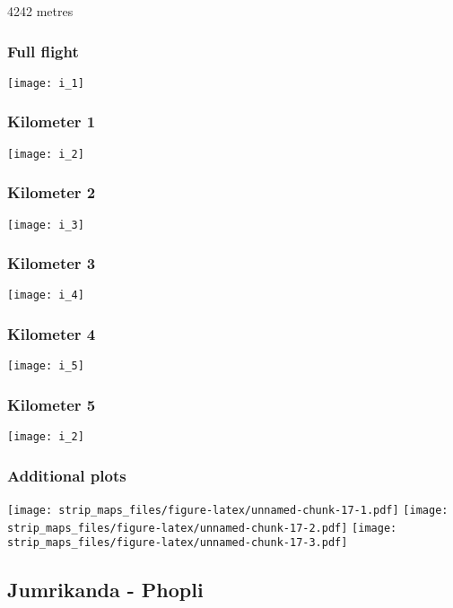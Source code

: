 \documentclass[]{article}
\begin{document}
4242 metres

\subsubsection{Full flight}\label{full-flight-8}

\texttt{[image: i\_1]}

\subsubsection{Kilometer 1}\label{kilometer-1-8}

\texttt{[image: i\_2]}

\subsubsection{Kilometer 2}\label{kilometer-2-8}

\texttt{[image: i\_3]}

\subsubsection{Kilometer 3}\label{kilometer-3-8}

\texttt{[image: i\_4]}

\subsubsection{Kilometer 4}\label{kilometer-4-8}

\texttt{[image: i\_5]}

\subsubsection{Kilometer 5}\label{kilometer-5-8}

\texttt{[image: i\_2]}

\subsubsection{Additional plots}\label{additional-plots-8}

\texttt{[image: strip\_maps\_files/figure-latex/unnamed-chunk-17-1.pdf]}
\texttt{[image: strip\_maps\_files/figure-latex/unnamed-chunk-17-2.pdf]}
\texttt{[image: strip\_maps\_files/figure-latex/unnamed-chunk-17-3.pdf]}

\newpage

\subsection{Jumrikanda - Phopli}\label{jumrikanda---phopli}
\end{document}
